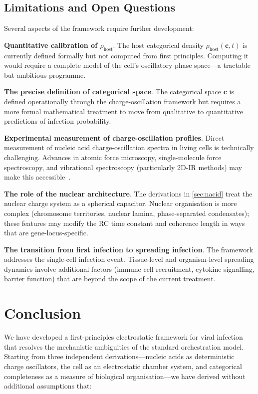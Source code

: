 \documentclass[11pt,twocolumn,a4paper]{article}
\theoremstyle{definition}
\theoremstyle{remark}
\newcommand{\Phost}{\rho_{\mathrm{host}}}
\newcommand{\vv}[1]{\boldsymbol{#1}}
\begin{document}
\subsection{Limitations and Open Questions}

Several aspects of the framework require further development:

\textbf{Quantitative calibration of $\Phost$}. The host categorical density $\Phost(\vv{c}, t)$ is currently defined formally but not computed from first principles. Computing it would require a complete model of the cell's oscillatory phase space---a tractable but ambitious programme.

\textbf{The precise definition of categorical space}. The categorical space $\vv{c}$ is defined operationally through the charge-oscillation framework but requires a more formal mathematical treatment to move from qualitative to quantitative predictions of infection probability.

\textbf{Experimental measurement of charge-oscillation profiles}. Direct measurement of nucleic acid charge-oscillation spectra in living cells is technically challenging. Advances in atomic force microscopy, single-molecule force spectroscopy, and vibrational spectroscopy (particularly 2D-IR methods) may make this accessible~\cite{Boxer2009,Oklejas2002}.

\textbf{The role of the nuclear architecture}. The derivations in \cref{sec:nacid} treat the nuclear charge system as a spherical capacitor. Nuclear organisation is more complex (chromosome territories, nuclear lamina, phase-separated condensates); these features may modify the RC time constant and coherence length in ways that are gene-locus-specific.

\textbf{The transition from first infection to spreading infection}. The framework addresses the single-cell infection event. Tissue-level and organism-level spreading dynamics involve additional factors (immune cell recruitment, cytokine signalling, barrier function) that are beyond the scope of the current treatment.

\section{Conclusion}
\label{sec:conclusion}

We have developed a first-principles electrostatic framework for viral infection that resolves the mechanistic ambiguities of the standard orchestration model. Starting from three independent derivations---nucleic acids as deterministic charge oscillators, the cell as an electrostatic chamber system, and categorical completeness as a measure of biological organisation---we have derived without additional assumptions that:
\end{document}
